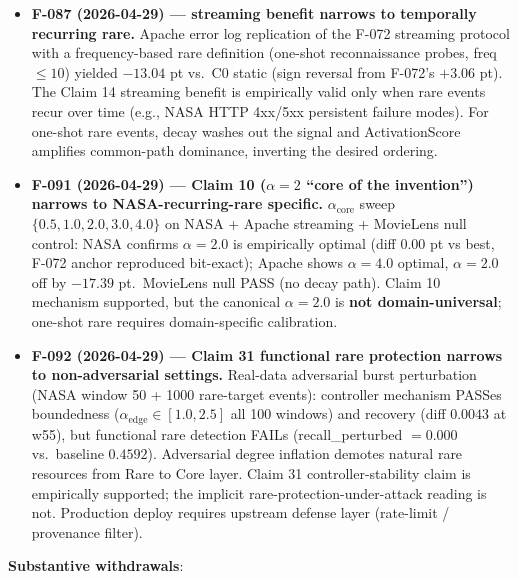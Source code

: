 \begin{itemize}
\tightlist
\item
  \textbf{F-087 (2026-04-29) --- streaming benefit narrows to temporally
  recurring rare.} Apache error log replication of the F-072 streaming
  protocol with a frequency-based rare definition (one-shot
  reconnaissance probes, freq \(\le 10\)) yielded \(-13.04\) pt vs.~C0
  static (sign reversal from F-072's \(+3.06\) pt). The Claim 14 streaming
  benefit is empirically valid only when rare events recur over time
  (e.g., NASA HTTP 4xx/5xx persistent failure modes). For one-shot rare
  events, decay washes out the signal and ActivationScore amplifies
  common-path dominance, inverting the desired ordering.
\item
  \textbf{F-091 (2026-04-29) --- Claim 10 (\(\alpha=2\) ``core of the invention'')
  narrows to NASA-recurring-rare specific.} \(\alpha_{\text{core}}\) sweep
  \(\{0.5, 1.0, 2.0, 3.0, 4.0\}\) on NASA + Apache streaming + MovieLens
  null control: NASA confirms \(\alpha=2.0\) is empirically optimal
  (diff \(0.00\) pt vs best, F-072 anchor reproduced bit-exact); Apache
  shows \(\alpha=4.0\) optimal, \(\alpha=2.0\) off by \(-17.39\) pt.~MovieLens
  null PASS (no decay path). Claim 10 mechanism supported, but the
  canonical \(\alpha=2.0\) is \textbf{not domain-universal}; one-shot rare
  requires domain-specific calibration.
\item
  \textbf{F-092 (2026-04-29) --- Claim 31 functional rare protection narrows
  to non-adversarial settings.} Real-data adversarial burst
  perturbation (NASA window 50 + 1000 rare-target events): controller
  mechanism PASSes boundedness (\(\alpha_{\text{edge}} \in [1.0, 2.5]\)
  all 100 windows) and recovery (diff \(0.0043\) at w55), but functional
  rare detection FAILs (recall\_perturbed \(= 0.000\) vs.~baseline
  \(0.4592\)). Adversarial degree inflation demotes natural rare resources
  from Rare to Core layer. Claim 31 controller-stability claim is
  empirically supported; the implicit rare-protection-under-attack
  reading is not. Production deploy requires upstream defense layer
  (rate-limit / provenance filter).
\end{itemize}

\textbf{Substantive withdrawals}:

